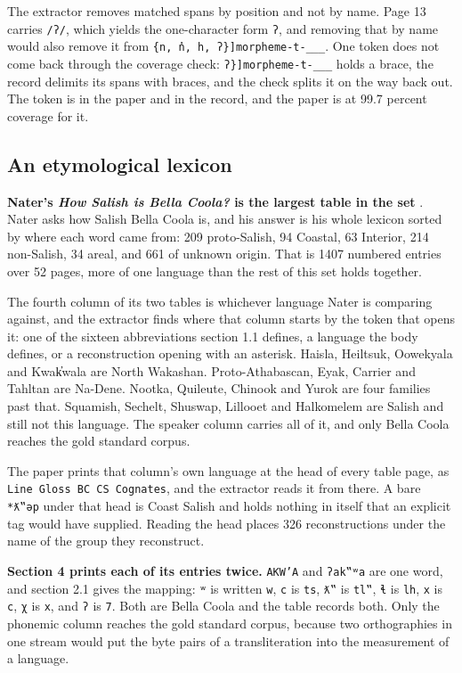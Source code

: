 The extractor removes matched spans by position and not by name. Page 13 carries \texttt{/ʔ/}, which yields the one-character form \texttt{ʔ}, and removing that by name would also remove it from \texttt{\{n, n̓, h, ʔ\}]morpheme-t-\_\_\_}. One token does not come back through the coverage check: \texttt{ʔ\}]morpheme-t-\_\_\_} holds a brace, the record delimits its spans with braces, and the check splits it on the way back out. The token is in the paper and in the record, and the paper is at 99.7 percent coverage for it.

\subsection{An etymological lexicon}

\textbf{Nater's \emph{How Salish is Bella Coola?} is the largest table in the set} \cite{src:Nater-2013}. Nater asks how Salish Bella Coola is, and his answer is his whole lexicon sorted by where each word came from: 209 proto-Salish, 94 Coastal, 63 Interior, 214 non-Salish, 34 areal, and 661 of unknown origin. That is 1407 numbered entries over 52 pages, more of one language than the rest of this set holds together.

The fourth column of its two tables is whichever language Nater is comparing against, and the extractor finds where that column starts by the token that opens it: one of the sixteen abbreviations section 1.1 defines, a language the body defines, or a reconstruction opening with an asterisk. Haisla, Heiltsuk, Oowekyala and Kwak̓wala are North Wakashan. Proto-Athabascan, Eyak, Carrier and Tahltan are Na-Dene. Nootka, Quileute, Chinook and Yurok are four families past that. Squamish, Sechelt, Shuswap, Lillooet and Halkomelem are Salish and still not this language. The speaker column carries all of it, and only Bella Coola reaches the gold standard corpus.

The paper prints that column's own language at the head of every table page, as \texttt{Line Gloss BC CS Cognates}, and the extractor reads it from there. A bare \texttt{*ƛ‟ǝp} under that head is Coast Salish and holds nothing in itself that an explicit tag would have supplied. Reading the head places 326 reconstructions under the name of the group they reconstruct.

\textbf{Section 4 prints each of its entries twice.} \texttt{AKW'A} and \texttt{ʔak‟ʷa} are one word, and section 2.1 gives the mapping: \texttt{ʷ} is written \texttt{w}, \texttt{c} is \texttt{ts}, \texttt{ƛ‟} is \texttt{tl‟}, \texttt{ɬ} is \texttt{lh}, \texttt{x} is \texttt{c}, \texttt{χ} is \texttt{x}, and \texttt{ʔ} is \texttt{7}. Both are Bella Coola and the table records both. Only the phonemic column reaches the gold standard corpus, because two orthographies in one stream would put the byte pairs of a transliteration into the measurement of a language.

